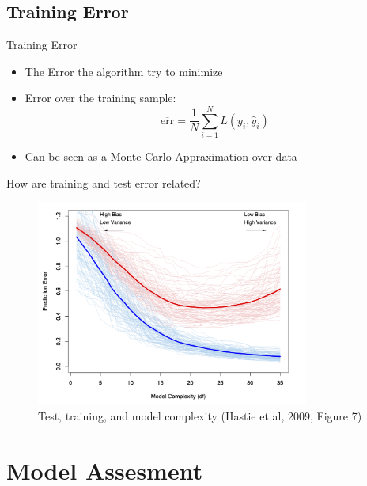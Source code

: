 \documentclass[10pt,handout]{beamer}
\begin{document}
\subsection{Training Error}

\begin{frame}{Training Error}

\begin{itemize}
\item The Error the algorithm try to minimize
\item Error over the training sample:
\[
\overline{\text{err}} = \frac{1}{N} \sum_{i=1}^N L(y_i,\hat{y}_i)
\]
\item Can be seen as a Monte Carlo Appraximation over data

\end{itemize}

\end{frame}


\begin{frame}{How are training and test error related?}


\begin{figure}[h]
\caption{Test, training, and model complexity (Hastie et al, 2009, Figure 7)}
\centering
\includegraphics[width=0.8\textwidth]{figs/ESL_7_1.png}
\end{figure}

\end{frame}


\section{Model Assesment}
\end{document}
